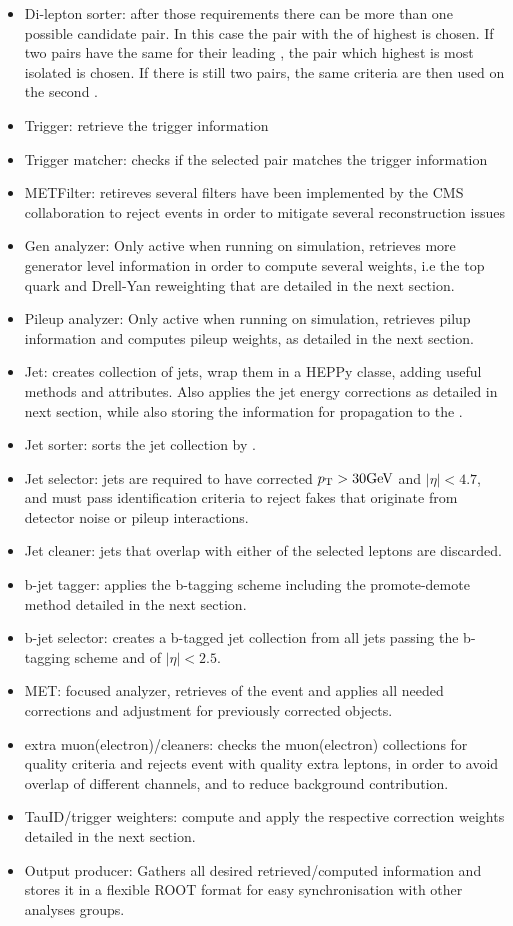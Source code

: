 \begin{itemize}
    \item Di-lepton sorter: after those requirements there can be more than one possible candidate pair. In this case the pair with the \tauh of highest \pt is chosen. If two pairs have the same \pt for their leading \tauh, the pair which highest \pt \tauh is most isolated is chosen. If there is still two pairs, the same criteria are then used on the second \tauh.
    \item Trigger: retrieve the trigger information
    \item Trigger matcher: checks if the selected \tauh pair matches the trigger information
    \item METFilter: retireves several filters have been implemented by the CMS collaboration to reject events in order to mitigate several \MET reconstruction issues
    \item Gen analyzer: Only active when running on simulation, retrieves more generator level information in order to compute several weights, i.e the top quark and Drell-Yan \pt reweighting that are detailed in the next section.
    \item Pileup analyzer: Only active when running on simulation, retrieves pilup information and computes pileup weights, as detailed in the next section.
    \item Jet: creates collection of jets, wrap them in a HEPPy classe, adding useful methods and attributes. Also applies the jet energy corrections as detailed in next section, while also storing the information for propagation to the \MET.
    \item Jet sorter: sorts the jet collection by \pt.
    \item Jet selector: jets are required to have corrected $p_{\mathrm{T}} > 30 \mathrm{GeV}$ and $|\eta| < 4.7$, and must pass identification criteria to reject fakes that originate from detector noise or pileup interactions.
    \item Jet cleaner: jets that overlap with either of the selected leptons are discarded.
    \item b-jet tagger: applies the b-tagging scheme including the promote-demote method detailed in the next section.
    \item b-jet selector: creates a b-tagged jet collection from all jets passing the b-tagging scheme and of $|\eta|<2.5$.
    \item MET: \MET focused analyzer, retrieves \MET of the event and applies all needed corrections and adjustment for previously corrected objects.
    \item extra muon(electron)/cleaners: checks the muon(electron) collections for quality criteria and rejects event with quality extra leptons, in order to avoid overlap of different channels, and to reduce background contribution.
    \item TauID/trigger weighters: compute and apply the respective correction weights detailed in the next section.
    \item Output producer: Gathers all desired retrieved/computed information and stores it in a flexible ROOT format for easy synchronisation with other analyses groups.
\end{itemize}

